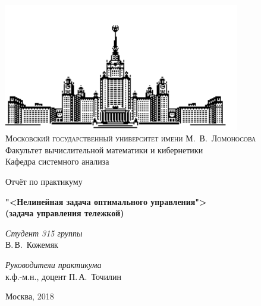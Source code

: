 \documentclass[11pt]{article}
\begin{document}
\begin{center}
    \ \vspace{-3cm}
    
    \includegraphics[width=0.5
    \textwidth]{msu}\\
    {\scshape Московский государственный университет имени М.~В.~Ломоносова}\\
    Факультет вычислительной математики и кибернетики\\
    Кафедра системного анализа
    
    \vfill
    
    {\LARGE Отчёт по практикуму}
    
    \vspace{1cm}
    
    {\Huge\bfseries "<Нелинейная задача оптимального управления">\\ (задача управления тележкой)} 
\end{center}
\vspace{1cm}
\begin{flushright}
    \large \textit{Студент 315 группы}\\
    В.\,В.~Кожемяк
    
    \vspace{5mm}
    
    \textit{Руководители практикума}\\
    к.ф.-м.н., доцент П.\,А.~Точилин 
\end{flushright}

\vfill
\begin{center}
    Москва, 2018 
\end{center}
\pagebreak

\tableofcontents

\pagebreak
\end{document}

